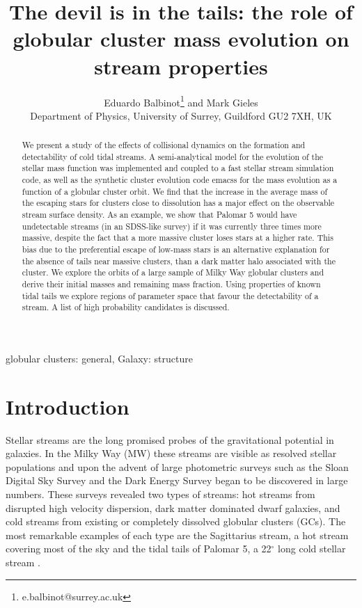 \documentclass[useAMS,usenatbib,fleqn]{mnras}
\title[The devil is in the tails]{The devil is in the tails: the role of
globular cluster mass evolution on stream properties}
\author[Balbinot \& Gieles]{Eduardo Balbinot\thanks{e.balbinot@surrey.ac.uk} 
                            and Mark Gieles \\
                            Department of Physics, University of Surrey, Guildford GU2 7XH, UK
\\}
\def\deg{^{\circ}}
\newcommand{\comm}[1]{#1}
\begin{document}
\maketitle
\label{firstpage}
\pagerange{\pageref{firstpage}--\pageref{lastpage}}

\begin{abstract}
    We present a study of the effects of collisional dynamics on the formation
    and detectability of cold tidal streams. A semi-analytical model for the
    evolution of the stellar mass function was implemented and coupled to a fast
    stellar stream simulation code, as well as the synthetic cluster evolution
    code {\sc emacss} for the mass evolution as a function of a globular cluster
    orbit. We find that the increase in the average mass of the escaping stars
    for clusters close to dissolution has a major effect on the observable
    stream surface density. As an example, we show that Palomar 5 would have
    undetectable  streams (in an SDSS-like survey) if it was currently three
    times more massive, despite the fact that a more massive cluster loses stars
    at a higher rate. This bias due to the preferential escape of low-mass stars
    is \comm{an alternative} explanation for the absence of tails near massive
    clusters, than a dark matter halo associated with the cluster.  We explore
    the orbits of a large sample of Milky Way globular clusters and derive their
    initial masses and remaining mass fraction. Using properties of known tidal
    tails we explore regions of parameter space that favour the detectability of
    a stream. A list of high probability candidates is discussed.
\end{abstract}

\begin{keywords}
   globular clusters: general, Galaxy: structure
\end{keywords}

\section{Introduction}

Stellar streams are the long promised probes of the gravitational potential in
galaxies. In the Milky Way (MW) these streams are visible as resolved stellar
populations and upon the advent of large photometric surveys such as the Sloan
Digital Sky Survey \citep[SDSS;][]{sdss} and the Dark Energy Survey
\citep[DES;][]{des} began to be discovered in large numbers. These surveys
revealed two types of streams: hot streams from disrupted high velocity
dispersion, dark matter dominated dwarf galaxies, and cold streams from existing
or completely dissolved globular clusters (GCs). The most remarkable examples of
each type are the Sagittarius stream, a hot stream covering most of the sky
\citep{Newberg02} and the  tidal tails of Palomar 5, a 22$\deg$ long cold
stellar stream \citep{Odenkirchen01, Grillmair06, Bernard16}.
\end{document}
